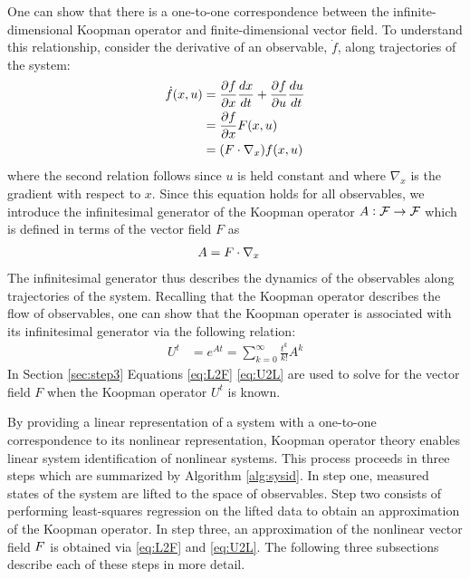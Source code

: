 One can show that there is a one-to-one correspondence between the infinite-dimensional Koopman operator and finite-dimensional vector field.
To understand this relationship, consider the derivative of an observable, $\dot{f}$, along trajectories of the system:
\begin{align}
    \dot{f}(x,u) &= \frac{\partial f}{\partial x} \frac{dx}{dt} + \frac{\partial f}{\partial u}\frac{du}{dt} \\
           &= \frac{\partial f}{\partial x} F(x,u) \\
           &= ( F \cdot \nabla_{x} ) f(x,u)
    \label{eq:fdot}
\end{align}
where the second relation follows since $u$ is held constant and where $\nabla_x$ is the gradient with respect to $x$.
Since this equation holds for all observables, we introduce the infinitesimal generator of the Koopman operator ${A:\mathcal{F} \to \mathcal{F}}$ \cite[Equation 7.6.5]{lasota2013chaos} which is defined in terms of the vector field $F$ as
\begin{align}
    A &= F \cdot \nabla_{x}
    \label{eq:L2F}
\end{align}
The infinitesimal generator thus describes the dynamics of the observables along trajectories of the system. 
Recalling that the Koopman operator describes the flow of observables, one can show that the Koopman operater is associated with its infinitesimal generator via the following relation:
\begin{align}
    U^t &= e^{A t} = \sum_{k=0}^\infty \frac{t^k}{k!} A^k
    \label{eq:U2L}
\end{align}
In Section \ref{sec:step3} Equations \eqref{eq:L2F} \eqref{eq:U2L} are used to solve for the vector field $F$ when the Koopman operator $U^t$ is known.

By providing a linear representation of a system with a one-to-one correspondence to its nonlinear representation, Koopman operator theory enables linear system identification of nonlinear systems. 
This process proceeds in three steps which are summarized by Algorithm \ref{alg:sysid}.
In step one, measured states of the system are lifted to the space of observables.
Step two consists of performing least-squares regression on the lifted data to obtain an approximation of the Koopman operator.
In step three, an approximation of the nonlinear vector field $F$ is obtained via \eqref{eq:L2F} and \eqref{eq:U2L}.
The following three subsections describe each of these steps in more detail.


